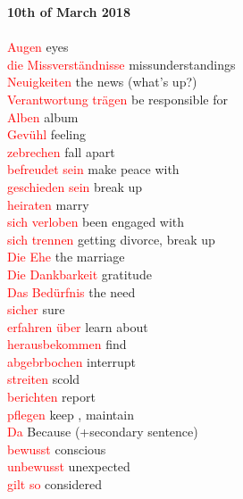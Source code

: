 \documentclass{article}
\begin{document}
	
	\textbf{10th of March 2018}\\\\
	\textcolor{red}{Augen} eyes\\
	\textcolor{red}{die Missverständnisse} missunderstandings\\
	\textcolor{red}{Neuigkeiten} the news (what's up?)\\
	\textcolor{red}{Verantwortung trägen} be responsible for\\
	\textcolor{red}{Alben} album\\
	\textcolor{red}{Gevühl} feeling\\
	\textcolor{red}{zebrechen} fall apart\\
	\textcolor{red}{befreudet sein} make peace with\\
	\textcolor{red}{geschieden sein} break up\\
	\textcolor{red}{heiraten} marry\\
	\textcolor{red}{sich verloben} been engaged with\\
	\textcolor{red}{sich trennen} getting divorce, break up\\
	\textcolor{red}{Die Ehe} the marriage\\
	\textcolor{red}{Die Dankbarkeit} gratitude\\
	\textcolor{red}{Das Bedürfnis} the need\\
	\textcolor{red}{sicher} sure\\
	\textcolor{red}{erfahren über} learn about\\
	\textcolor{red}{herausbekommen} find\\
	\textcolor{red}{abgebrbochen} interrupt \\ 
	\textcolor{red}{streiten} scold \\
	\textcolor{red}{berichten} report \\
	\textcolor{red}{pflegen} keep , maintain \\
	\textcolor{red}{Da} Because (+secondary sentence)\\
	\textcolor{red}{bewusst} conscious\\
	\textcolor{red}{unbewusst} unexpected\\
	\textcolor{red}{gilt so} considered\\\\
	
\end{document}
